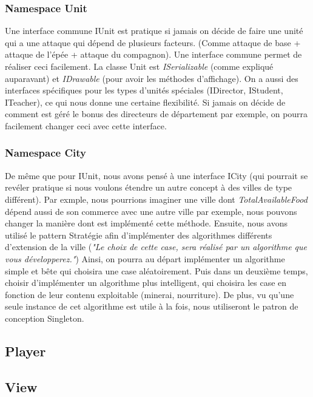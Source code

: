 		\subsubsection{Namespace Unit}
			Une interface commune IUnit est pratique si jamais on décide de faire une unité qui a une attaque qui dépend de plusieurs facteurs.
		(Comme attaque de base + attaque de l'épée + attaque du compagnon). Une interface commune permet de réaliser ceci facilement.
			La classe Unit est \textit{ISerializable} (comme expliqué auparavant) et \textit{IDrawable} (pour avoir les méthodes d'affichage).
		On a aussi des interfaces spécifiques pour les types d'unités spéciales (IDirector, IStudent, ITeacher), ce qui nous donne une certaine flexibilité.
			Si jamais on décide de comment est géré le bonus des directeurs de département par exemple, on pourra facilement changer ceci avec cette interface.
		
		\subsubsection{Namespace City}
			De même que pour IUnit, nous avons pensé à une interface ICity (qui pourrait se revéler pratique si nous voulons étendre un autre concept à des villes de type différent).
		Par exmple, nous pourrions imaginer une ville dont \textit{TotalAvailableFood} dépend aussi de son commerce avec une autre ville par exemple, nous pouvons changer la manière dont est implémenté cette méthode.
			Ensuite, nous avons utilisé le pattern Stratégie afin d'implémenter des algorithmes différents d'extension de la ville (\textit{"Le choix de cette case, sera réalisé par un algorithme que vous développerez."})
		Ainsi, on pourra au départ implémenter un algorithme simple et bête qui choisira une case aléatoirement.
			Puis dans un deuxième temps, choisir d'implémenter un algorithme plus intelligent, qui choisira les case en fonction de leur contenu exploitable (minerai, nourriture).
		De plus, vu qu'une seule instance de cet algorithme est utile à la fois, nous utiliseront le patron de conception Singleton.
			
		
	\subsection{Player}
	\subsection{View}
